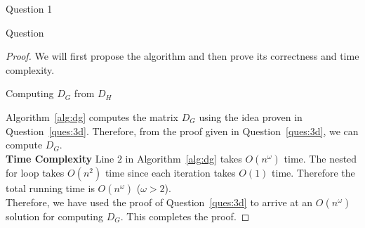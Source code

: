 \begin{solution}{Question 1}\label{ques:3d}
    \begin{question}
        Question
    \end{question}
    \tcblower{}
    \begin{proof}
      We will first propose the algorithm and then prove its correctness and time complexity.
      \begin{algorithm}[H]
        \caption{Computing $D_G$ from $D_H$}\label{alg:dg}
        \begin{algorithmic}[1]
                \Else{}
                \EndIf{}
              \EndFor{}
            \EndFor{}
          \EndProcedure{}
        \end{algorithmic}
      \end{algorithm}
      Algorithm~\ref{alg:dg} computes the matrix $D_G$ using the idea proven in Question~\ref{ques:3d}. Therefore, from the proof given in Question~\ref{ques:3d}, we can compute $D_G$.\\
      \textbf{Time Complexity} Line $2$ in Algorithm~\ref{alg:dg} takes $O(n^\omega)$ time. The nested for loop takes $O(n^2)$ time since each iteration takes $O(1)$ time. Therefore the total running time is $O(n^\omega)$ ($\omega > 2$).\\
      Therefore, we have used the proof of Question~\ref{ques:3d} to arrive at an $O(n^\omega)$ solution for computing $D_G$. This completes the proof.
    \end{proof}
\end{solution}
